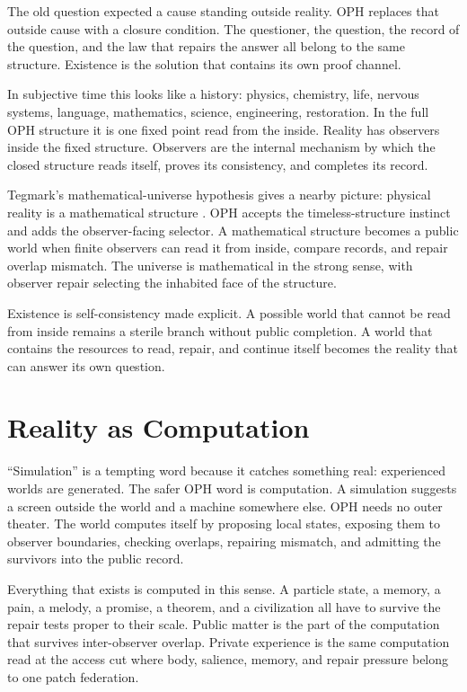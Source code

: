 \documentclass[11pt]{article}
\theoremstyle{remark}
\theoremstyle{plain}
\begin{document}
The old question expected a cause standing outside reality. OPH replaces that
outside cause with a closure condition. The questioner, the question, the
record of the question, and the law that repairs the answer all belong to the
same structure. Existence is the solution that contains its own proof channel.

In subjective time this looks like a history: physics, chemistry, life,
nervous systems, language, mathematics, science, engineering, restoration. In
the full OPH structure it is one fixed point read from the inside. Reality has
observers inside the fixed structure. Observers are the internal mechanism by
which the closed structure reads itself, proves its consistency, and completes
its record.

Tegmark's mathematical-universe hypothesis gives a nearby picture:
physical reality is a mathematical structure
\cite{Tegmark2007}. OPH accepts the timeless-structure instinct and adds the
observer-facing selector. A mathematical structure becomes a public world when
finite observers can read it from inside, compare records, and repair overlap
mismatch. The universe is mathematical in the strong sense, with
observer repair selecting the inhabited face of the structure.

Existence is self-consistency made explicit. A possible world that
cannot be read from inside remains a sterile branch without public completion.
A world that contains the resources to read, repair, and continue itself becomes
the reality that can answer its own question.

\section{Reality as Computation}

``Simulation'' is a tempting word because it catches something real: experienced
worlds are generated. The safer OPH word is computation. A simulation suggests a
screen outside the world and a machine somewhere else. OPH needs no outer
theater. The world computes itself by proposing local states, exposing them to
observer boundaries, checking overlaps, repairing mismatch, and admitting the
survivors into the public record.

Everything that exists is computed in this sense. A particle state, a memory, a
pain, a melody, a promise, a theorem, and a civilization all have to survive the
repair tests proper to their scale. Public matter is the part of the computation
that survives inter-observer overlap. Private experience is the same computation
read at the access cut where body, salience, memory, and repair pressure belong
to one patch federation.
\end{document}
